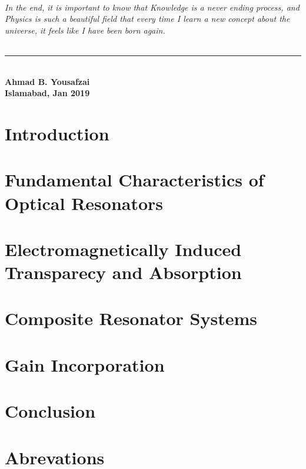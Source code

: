 \documentclass[12pt,twoside]{report}
\begin{document}
\subparagraph*{ \normalfont	In the end, it is important to know that Knowledge is a never ending process, and Physics is such a beautiful field that every time I learn a new concept about the universe, it feels like I have been born again.}
\begin{flushleft}
\noindent\rule{5cm}{0.5pt}\\
\textbf{\small Ahmad B. Yousafzai}\\
\textbf{\small Islamabad, Jan 2019}
\end{flushleft}


\begin{scriptsize}
\small \tableofcontents
\end{scriptsize}
\small \listoffigures
\newpage
{}
\fancyhead[RO,LE]{}
\fancyfoot[LE,RO]{\thepage}
\renewcommand{\footrulewidth}{0.5pt}

\pagestyle{fancy}

\chapter{Introduction}

 
\chapter{Fundamental Characteristics of Optical Resonators}

 
\chapter{Electromagnetically Induced Transparecy and Absorption}

 
\chapter{Composite Resonator Systems}

 
\chapter{Gain Incorporation}


\chapter{Conclusion}

\appendix
\chapter{Abrevations}

\end{document}
